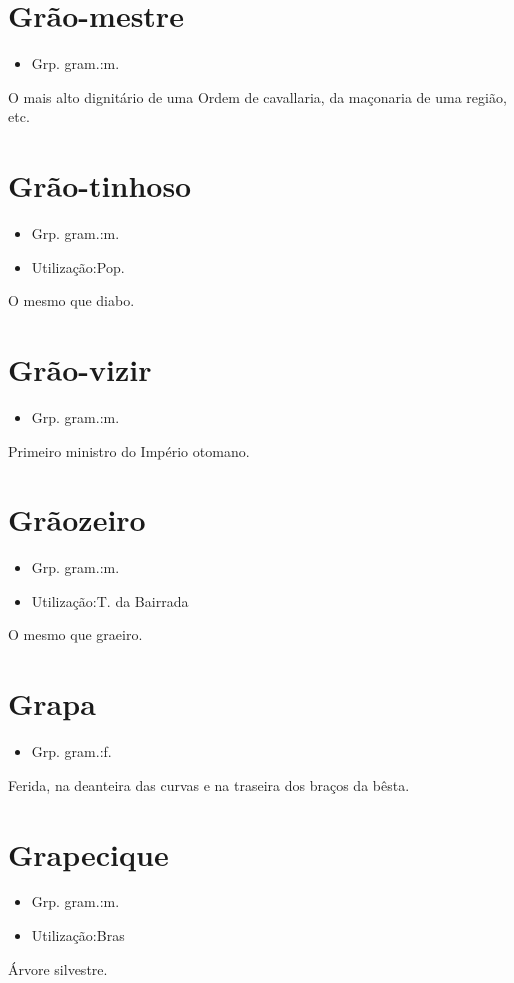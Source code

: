 \section{Grão-mestre}
\begin{itemize}
\item {Grp. gram.:m.}
\end{itemize}
O mais alto dignitário de uma Ordem de cavallaria, da maçonaria de uma região, etc.
\section{Grão-tinhoso}
\begin{itemize}
\item {Grp. gram.:m.}
\end{itemize}
\begin{itemize}
\item {Utilização:Pop.}
\end{itemize}
O mesmo que \textunderscore diabo\textunderscore .
\section{Grão-vizir}
\begin{itemize}
\item {Grp. gram.:m.}
\end{itemize}
Primeiro ministro do Império otomano.
\section{Grãozeiro}
\begin{itemize}
\item {Grp. gram.:m.}
\end{itemize}
\begin{itemize}
\item {Utilização:T. da Bairrada}
\end{itemize}
O mesmo que \textunderscore graeiro\textunderscore .
\section{Grapa}
\begin{itemize}
\item {Grp. gram.:f.}
\end{itemize}
Ferida, na deanteira das curvas e na traseira dos braços da bêsta.
\section{Grapecique}
\begin{itemize}
\item {Grp. gram.:m.}
\end{itemize}
\begin{itemize}
\item {Utilização:Bras}
\end{itemize}
Árvore silvestre.
